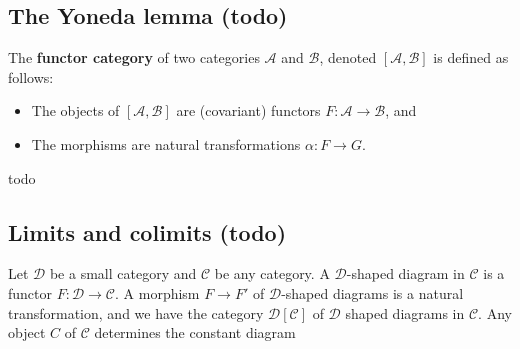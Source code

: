 \subsection{The Yoneda lemma (todo)}
\begin{definition}
    The \textbf{functor category} of two categories $\mathcal{A} $ and $\mathcal{B} $, denoted $[\mathcal{A} ,\mathcal{B} ]$ is defined as follows:
    \begin{itemize}
        \item The objects of $[\mathcal{A} ,\mathcal{B} ]$ are (covariant) functors $F \colon \mathcal{A}  \to \mathcal{B} $, and 
        \item The morphisms are natural transformations $\alpha \colon F \to G$.
    \end{itemize}
\end{definition}
todo

\subsection{Limits and colimits (todo)}
Let $\mathcal{D} $ be a small category and $\mathcal{C} $ be any category. A $\mathcal{D} $-shaped diagram in $\mathcal{C} $ is a functor $F \colon \mathcal{D}  \to \mathcal{C} $. A morphism $F\to F'$ of $\mathcal{D} $-shaped diagrams is a natural transformation, and we have the category $\mathcal{D} [\mathcal{C} ]$ of $\mathcal{D} $ shaped diagrams in $\mathcal{C} $. Any object $C$ of $\mathcal{C} $ determines the constant diagram
